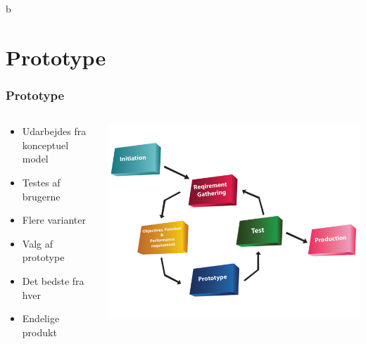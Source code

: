 b\documentclass{beamer}
\begin{document}
\section{Prototype}
\begin{frame}
  \frametitle{Prototype}
  \begin{columns}[T]
    \begin{column}{.5\textwidth}
	  \begin{itemize}
		\item Udarbejdes fra konceptuel model
		\item Testes af brugerne
		\item Flere varianter
		\item Valg af prototype
		\item Det bedste fra hver
		\item Endelige produkt
	  \end{itemize}
    \end{column}
    \begin{column}{.5\textwidth}
      \includegraphics[width=\textwidth]{prototyping.png}
    \end{column}
  \end{columns}
\end{frame}
\end{document}
